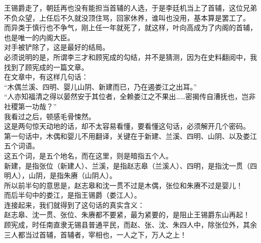 \begin{multicols}{\theparacolNo}
王锡爵走了，朝廷再也没有能担当首辅的人选，于是李廷机当上了首辅，这位兄弟不负众望，上任后不久就没顶住骂，回家休养，谁叫也没用，基本算是罢工了。\\

而异类于慎行也不争气，刚上任一年就死了，就这样，叶向高成为了内阁的首辅，也是唯一的内阁大臣。\\

对手被铲除了，这是最好的结局。\\

必须说明的是，所谓李三才和顾宪成的勾结，并不是猜测，因为在史料翻阅中，我找到了顾宪成的一篇文章。\\

在文章中，有这样几句话：\\

“木偶兰溪、四明、婴儿山阴、新建而已，乃在遏娄江之出耳。”\\

“人亦知福清之得以晏然安于其位者，全赖娄江之不果出……密揭传自漕抚也，岂非社稷第一功哉？”\\

我看过之后，顿感毛骨悚然。\\

这是两句惊天动地的话，却不太容易看懂，要看懂这句话，必须解开几个密码。\\

第一句话中，木偶和婴儿不用翻译，关键在于新建、兰溪、四明、山阴、以及娄江五个词语。\\

这五个词，是五个地名，而在这里，则是暗指五个人。\\

新建，是指张位（新建人）、兰溪，是指赵志皋（兰溪人）、四明，是指沈一贯（四明人），山阴，是指朱赓（山阴人）。\\

所以前半句的意思是，赵志皋和沈一贯不过是木偶，张位和朱赓不过是婴儿！\\

而后半句中的娄江，是指王锡爵（娄江人）。\\

连接起来，我们就得到了这句话的真实含义：\\

赵志皋、沈一贯、张位、朱赓都不要紧，最为紧要的，是阻止王锡爵东山再起！\\

顾宪成，时任南直隶无锡县普通平民，而赵、张、沈、朱四人中，除张位外，其余三人都当过首辅，首辅者，宰相也，一人之下，万人之上！\\


\end{multicols}
